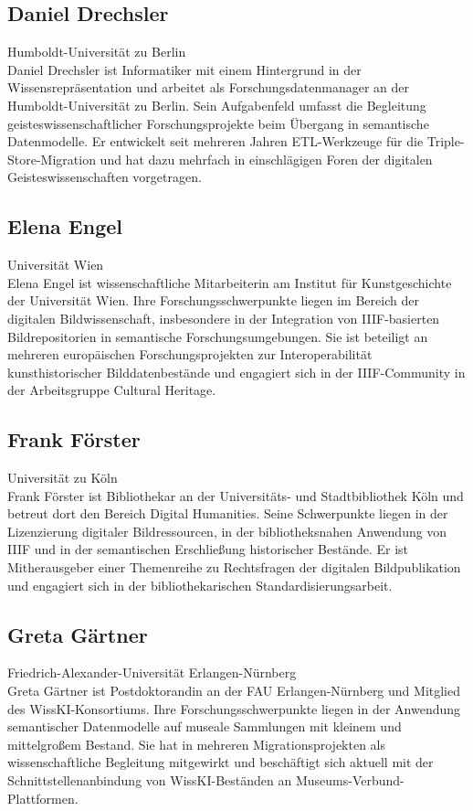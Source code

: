\subsection*{Daniel Drechsler}
\noindent\small Humboldt-Universität zu Berlin \\
Daniel Drechsler ist Informatiker mit einem Hintergrund in der Wissensrepräsentation und arbeitet als Forschungsdatenmanager an der Humboldt-Universität zu Berlin. Sein Aufgabenfeld umfasst die Begleitung geisteswissenschaftlicher Forschungsprojekte beim Übergang in semantische Datenmodelle. Er entwickelt seit mehreren Jahren ETL-Werkzeuge für die Triple-Store-Migration und hat dazu mehrfach in einschlägigen Foren der digitalen Geisteswissenschaften vorgetragen.

\subsection*{Elena Engel}
\noindent\small Universität Wien \\
Elena Engel ist wissenschaftliche Mitarbeiterin am Institut für Kunstgeschichte der Universität Wien. Ihre Forschungsschwerpunkte liegen im Bereich der digitalen Bildwissenschaft, insbesondere in der Integration von IIIF-basierten Bildrepositorien in semantische Forschungsumgebungen. Sie ist beteiligt an mehreren europäischen Forschungsprojekten zur Interoperabilität kunsthistorischer Bilddatenbestände und engagiert sich in der IIIF-Community in der Arbeitsgruppe \glqq Cultural Heritage\grqq.

\subsection*{Frank Förster}
\noindent\small Universität zu Köln \\
Frank Förster ist Bibliothekar an der Universitäts- und Stadtbibliothek Köln und betreut dort den Bereich Digital Humanities. Seine Schwerpunkte liegen in der Lizenzierung digitaler Bildressourcen, in der bibliotheksnahen Anwendung von IIIF und in der semantischen Erschließung historischer Bestände. Er ist Mitherausgeber einer Themenreihe zu Rechtsfragen der digitalen Bildpublikation und engagiert sich in der bibliothekarischen Standardisierungsarbeit.

\subsection*{Greta Gärtner}
\noindent\small Friedrich-Alexander-Universität Erlangen-Nürnberg \\
Greta Gärtner ist Postdoktorandin an der FAU Erlangen-Nürnberg und Mitglied des WissKI-Konsortiums. Ihre Forschungsschwerpunkte liegen in der Anwendung semantischer Datenmodelle auf museale Sammlungen mit kleinem und mittelgroßem Bestand. Sie hat in mehreren Migrationsprojekten als wissenschaftliche Begleitung mitgewirkt und beschäftigt sich aktuell mit der Schnittstellenanbindung von WissKI-Beständen an Museums-Verbund-Plattformen.

